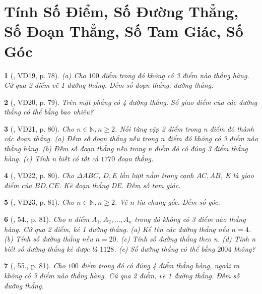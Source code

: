 \documentclass{article}
\newtheorem{baitoan}{}
\begin{document}
\section{Tính Số Điểm, Số Đường Thẳng, Số Đoạn Thẳng, Số Tam Giác, Số Góc}

\begin{baitoan}[\cite{Binh_Toan_6_tap_2}, VD19, p. 78]
	(a) Cho $100$ điểm trong đó không có 3 điểm nào thẳng hàng. Cứ qua 2 điểm vẽ 1 đường thẳng. Đếm số đoạn thẳng, đường thẳng.
\end{baitoan}

\begin{baitoan}[\cite{Binh_Toan_6_tap_2}, VD20, p. 79]
	Trên mặt phẳng có 4 đường thẳng. Số giao điểm của các đường thẳng có thể bằng bao nhiêu?
\end{baitoan}

\begin{baitoan}[\cite{Binh_Toan_6_tap_2}, VD21, p. 80]
	Cho $n\in\mathbb{N},n\ge2$. Nối từng cặp 2 điểm trong n điểm đó thành các đoạn thẳng. (a) Đếm số đoạn thẳng nếu trong n điểm đó không có 3 điểm nào thẳng hàng. (b) Đếm số đoạn thẳng nếu trong n điểm đó có đúng 3 điểm thẳng hàng. (c) Tính n biết có tất cả $1770$ đoạn thẳng.
\end{baitoan}

\begin{baitoan}[\cite{Binh_Toan_6_tap_2}, VD22, p. 80]
	Cho $\Delta ABC$, $D,E$ lần lượt nằm trong cạnh $AC,AB$, K là giao điểm của $BD,CE$. Kẽ đoạn thẳng DE. Đếm số tam giác. 
\end{baitoan}

\begin{baitoan}[\cite{Binh_Toan_6_tap_2}, VD23, p. 81]
	Cho $n\in\mathbb{N},n\ge2$. Vẽ $n$ tia chung gốc. Đếm số góc.
\end{baitoan}

\begin{baitoan}[\cite{Binh_Toan_6_tap_2}, 54., p. 81]
	Cho n điểm $A_1,A_2,\ldots,A_n$ trong đó không có 3 điểm nào thẳng hàng. Cứ qua 2 điểm, kẻ 1 đường thẳng. (a) Kể tên các đường thẳng nếu $n = 4$. (b) Tính số đường thẳng nếu $n = 20$. (c) Tính số đường thẳng theo n. (d) Tính n biết số đường thẳng kẻ được là $1128$. (e) Số đường thẳng có thể bằng $2004$ không?
\end{baitoan}

\begin{baitoan}[\cite{Binh_Toan_6_tap_2}, 55., p. 81]
	Cho $100$ điểm trong đó có đúng 4 điểm thẳng hàng, ngoài ra không có 3 điểm nào thẳng hàng. Cứ qua 2 điểm, vẽ 1 đường thẳng. Đếm số đường thẳng.
\end{baitoan}
\end{document}
